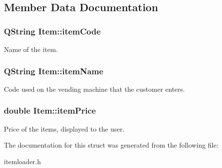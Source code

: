 \subsection{Member Data Documentation}
\hypertarget{struct_item_a35894237e42dd9ca0d737e660d07e370}{
\subsubsection[{item\-Code}]{\setlength{\rightskip}{0pt plus 5cm}Q\-String Item\-::item\-Code}}\label{struct_item_a35894237e42dd9ca0d737e660d07e370}
Name of the item. \hypertarget{struct_item_ae145622d2df65a4a45979fd7933b30c7}{
\subsubsection[{item\-Name}]{\setlength{\rightskip}{0pt plus 5cm}Q\-String Item\-::item\-Name}}\label{struct_item_ae145622d2df65a4a45979fd7933b30c7}
Code used on the vending machine that the customer enters. \hypertarget{struct_item_aa3f106177de7d68189cfe2b9051a54fd}{
\subsubsection[{item\-Price}]{\setlength{\rightskip}{0pt plus 5cm}double Item\-::item\-Price}}\label{struct_item_aa3f106177de7d68189cfe2b9051a54fd}
Price of the items, displayed to the user. 

The documentation for this struct was generated from the following file\-:\begin{DoxyCompactItemize}
\item 
itemloader.\-h\end{DoxyCompactItemize}
